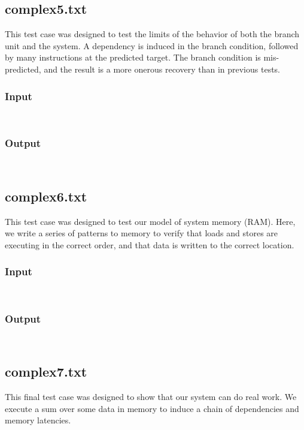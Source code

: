 \documentclass[12pt]{article}
\begin{document}
\subsection{complex5.txt}
This test case was designed to test the limits of the behavior of both the branch unit and the system.  A dependency is induced in the branch condition, followed by many instructions at the predicted target.  The branch condition is mis-predicted, and the result is a more onerous recovery than in previous tests.  

\subsubsection*{Input}
\begin{verbatim}
    
\end{verbatim}

\subsubsection*{Output}
\begin{verbatim}
    
\end{verbatim}

\subsection{complex6.txt}
This test case was designed to test our model of system memory (RAM).  Here, we write a series of patterns to memory to verify that loads and stores are executing in the correct order, and that data is written to the correct location.

\subsubsection*{Input}
\begin{verbatim}
    
\end{verbatim}

\subsubsection*{Output}
\begin{verbatim}
    
\end{verbatim}

\subsection{complex7.txt}
This final test case was designed to show that our system can do real work.  We execute a sum over some data in memory to induce a chain of dependencies and memory latencies.
\end{document}
